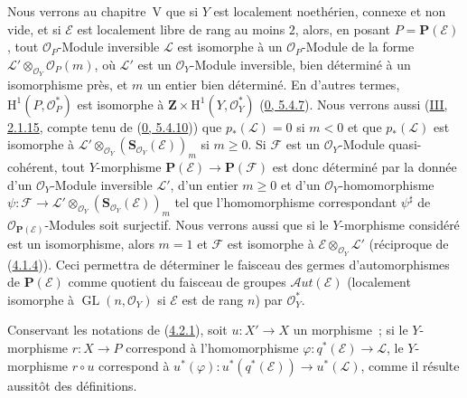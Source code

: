 \begin{remark}[4.2.7]
\label{II.4.2.7-fr}
Nous verrons au chapitre~V que si $Y$ est localement noethérien, connexe et non vide,
et si $\mathcal{E}$ est localement libre de rang au moins $2$, alors, en posant
$P=\mathbf{P}(\mathcal{E})$, tout $\mathcal{O}_P$-Module inversible
$\mathcal{L}$ est isomorphe à un $\mathcal{O}_P$-Module de la forme
$\mathcal{L}'\otimes_{\mathcal{O}_Y}\mathcal{O}_P(m)$, où $\mathcal{L}'$ est
un $\mathcal{O}_Y$-Module inversible, bien déterminé à un isomorphisme près,
et $m$ un entier bien déterminé. En d'autres termes,
$\mathrm{H}^1(P,\mathcal{O}_P^*)$ est isomorphe à
$\mathbf{Z}\times\mathrm{H}^1(Y,\mathcal{O}_Y^*)$
(\hyperref[0.5.4.7-fr]{0, 5.4.7}). Nous verrons aussi
(\hyperref[III.2.1.15-fr]{III, 2.1.15}, compte tenu de
(\hyperref[0.5.4.10-fr]{0, 5.4.10})) que
$p_*(\mathcal{L})=0$ si $m<0$ et que
$p_*(\mathcal{L})$ est isomorphe à
$\mathcal{L}'\otimes_{\mathcal{O}_Y}
(\mathbf{S}_{\mathcal{O}_Y}(\mathcal{E}))_m$ si $m\geq0$. Si $\mathcal{F}$
est un $\mathcal{O}_Y$-Module quasi-cohérent, tout $Y$-morphisme
$\mathbf{P}(\mathcal{E})\to\mathbf{P}(\mathcal{F})$ est donc déterminé par
la donnée d'un $\mathcal{O}_Y$-Module inversible $\mathcal{L}'$, d'un entier
$m\geq0$ et d'un $\mathcal{O}_Y$-homomorphisme
$\psi:\mathcal{F}\to\mathcal{L}'\otimes_{\mathcal{O}_Y}
(\mathbf{S}_{\mathcal{O}_Y}(\mathcal{E}))_m$ tel que l'homomorphisme
correspondant $\psi^\sharp$ de $\mathcal{O}_{\mathbf{P}(\mathcal{E})}$-Modules
soit surjectif. Nous verrons aussi que si le $Y$-morphisme considéré est un
isomorphisme, alors $m=1$ et $\mathcal{F}$ est isomorphe à
$\mathcal{E}\otimes_{\mathcal{O}_Y}\mathcal{L}'$ (réciproque de
(\hyperref[II.4.1.4-fr]{4.1.4})). Ceci permettra de déterminer le faisceau
des germes d'automorphismes de $\mathbf{P}(\mathcal{E})$ comme quotient du
faisceau de groupes $\mathcal{A}ut(\mathcal{E})$ (localement isomorphe à
$\operatorname{GL}(n,\mathcal{O}_Y)$ si $\mathcal{E}$ est de rang $n$) par
$\mathcal{O}_Y^*$.
\end{remark}

\begin{env}[4.2.8]
\label{II.4.2.8-fr}
Conservant les notations de (\hyperref[II.4.2.1-fr]{4.2.1}), soit
$u:X'\to X$ un morphisme~; si le $Y$-morphisme $r:X\to P$ correspond à
l'homomorphisme $\varphi:q^*(\mathcal{E})\to\mathcal{L}$, le $Y$-morphisme
$r\circ u$ correspond à
$u^*(\varphi):u^*(q^*(\mathcal{E}))\to u^*(\mathcal{L})$, comme il résulte
aussitôt des définitions.
\end{env}

